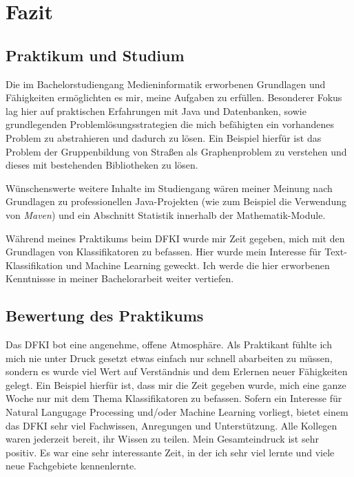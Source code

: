 \chapter{Fazit}
\section{Praktikum und Studium}
Die im Bachelorstudiengang Medieninformatik erworbenen Grundlagen und Fähigkeiten ermöglichten es mir, meine Aufgaben zu erfüllen.
Besonderer Fokus lag hier auf praktischen Erfahrungen mit Java und Datenbanken, sowie grundlegenden Problemlösungsstrategien die mich befähigten ein vorhandenes Problem zu abstrahieren und dadurch zu lösen.
Ein Beispiel hierfür ist das Problem der Gruppenbildung von Straßen als Graphenproblem zu verstehen und dieses mit bestehenden Bibliotheken zu lösen.

Wünschenswerte weitere Inhalte im Studiengang wären meiner Meinung nach Grundlagen zu professionellen Java-Projekten (wie zum Beispiel die Verwendung von \textit{Maven}) und ein Abschnitt Statistik innerhalb der Mathematik-Module.

Während meines Praktikums beim DFKI wurde mir Zeit gegeben, mich mit den Grundlagen von Klassifikatoren zu befassen.
Hier wurde mein Interesse für Text-Klassifikation und Machine Learning geweckt.
Ich werde die hier erworbenen Kenntnissse in meiner Bachelorarbeit weiter vertiefen.

\section{Bewertung des Praktikums}

Das DFKI bot eine angenehme, offene Atmosphäre.
Als Praktikant fühlte ich mich nie unter Druck gesetzt etwas einfach nur schnell abarbeiten zu müssen, sondern es wurde viel Wert auf Verständnis und dem Erlernen neuer Fähigkeiten gelegt.
Ein Beispiel hierfür ist, dass mir die Zeit gegeben wurde, mich eine ganze Woche nur mit dem Thema Klassifikatoren zu befassen.
Sofern ein Interesse für Natural Langugage Processing und/oder Machine Learning vorliegt, bietet einem das DFKI sehr viel Fachwissen, Anregungen und Unterstützung.
Alle Kollegen waren jederzeit bereit, ihr Wissen zu teilen.
Mein Gesamteindruck ist sehr positiv.
Es war eine sehr interessante Zeit, in der ich sehr viel lernte und viele neue Fachgebiete kennenlernte.
